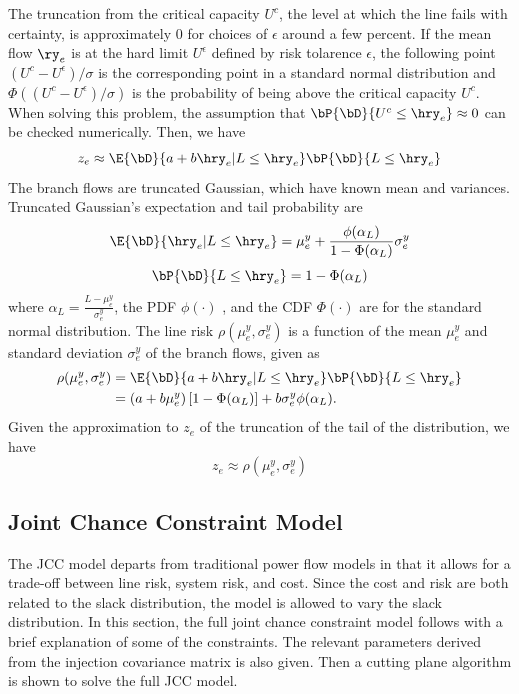  The truncation from the critical capacity $U^c$, the level at which the line fails with certainty, is approximately 0 for choices of $\epsilon$ around a few percent.  If the mean flow $\ry_e$ is at the hard limit $U^{\epsilon}$ defined by risk tolarence $\epsilon$, the following point $ (U^c - U^{\epsilon} )/\sigma $ is the corresponding point in a standard normal distribution and $\Phi \left( (U^c - U^{\epsilon} )/\sigma \right)$ is the probability of being above the critical capacity $U^c$.  When solving this problem, the assumption that $\bP{\bD}{ U^c \leq \hry_e } \approx 0 $ can be checked numerically.  Then, we have
\[ z_e \approx \E{\bD}{ a+b\hry_e | L \leq \hry_e } \bP{\bD}{L\leq \hry_e} \]
The branch flows are truncated Gaussian, which have known mean and variances. Truncated Gaussian's expectation and tail probability are
\[  \E{\bD}{ \hry_e | L \leq \hry_e } = \mu^y_e + \frac{\phi( \alpha_L )}{ 1- \Phi(\alpha_L)} \sigma^y_e \]
\[ \bP{\bD}{ L \leq \hry_e } = 1 - \Phi(\alpha_L) \]
where $\alpha_L = \frac{L - \mu^y_e}{\sigma^y_e}$, the PDF $\phi(\cdot)$ , and the CDF $\Phi(\cdot)$ are for the standard normal distribution.  The line risk  $\rho(\mu^y_e, \sigma^y_e)$ is a function of the mean $\mu^y_e$  and standard deviation $\sigma^y_e$ of the branch flows, given as
\begin{align}\label{line_risk2}
\rho (\mu^y_e,\sigma^y_e) &= \E{\bD}{ a+b\hry_e | L \leq \hry_e } \bP{\bD}{L\leq \hry_e} \\
&= (a + b \mu^y_e)\left[ 1 - \Phi(\alpha_L) \right]  + b \sigma^y_e \phi(\alpha_L) .
\end{align}
Given the approximation to $z_e$ of the truncation of the tail of the distribution, we have
\begin{equation}
z_e \approx \rho (\mu^y_e,\sigma^y_e)
\end{equation}








\subsection{Joint Chance Constraint Model}%
The JCC model departs from traditional power flow models in that it allows for a trade-off between line risk, system risk, and cost. Since the cost and risk are both related to the slack distribution, the model is allowed to vary the slack distribution.  In this section, the full joint chance constraint model follows with a brief explanation of some of the constraints.  The relevant parameters derived from the injection covariance matrix is also given.  Then a cutting plane algorithm is shown to solve the full JCC model.

